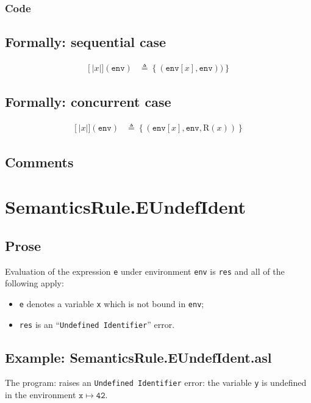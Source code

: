 \documentclass{book}
\newcommand\llbracket{[|}
\newcommand\rrbracket{|]}
\newcommand\interp[1]{\left\llbracket #1 \right\rrbracket}
\begin{document}
  \subsubsection{Code}

  \subsection{Formally: sequential case}
  \begin{align}
  \interp{x}(\texttt{env}) & \triangleq \left\{ (\texttt{env}[x], \texttt{env})) \right\}
  \label{eq:sem-seq-var}
  \end{align} 
 
  \subsection{Formally: concurrent case}
  \begin{align}
  \interp{x}(\texttt{env}) & \triangleq \left\{ (\texttt{env}[x], \texttt{env}, \text{R} (x)) \right\}
  \label{eq:sem-conc-var}
  \end{align} 

  \subsection{Comments}

\section{SemanticsRule.EUndefIdent \label{sec:SemanticsRule.EUndefIdent}}

  \subsection{Prose}

  Evaluation of the expression \texttt{e} under environment \texttt{env} is
  \texttt{res} and all of the following apply:
  \begin{itemize}
  \item \texttt{e} denotes a variable \texttt{x} which is not bound in \texttt{env};
  \item \texttt{res} is an ``\texttt{Undefined Identifier}'' error.
  \end{itemize}

  \subsection{Example: SemanticsRule.EUndefIdent.asl}
    The program:
    raises an \texttt{Undefined Identifier} error: the variable \texttt{y} is
    undefined in the environment $\mathtt{x} \mapsto \mathtt{42}$.
\end{document}
